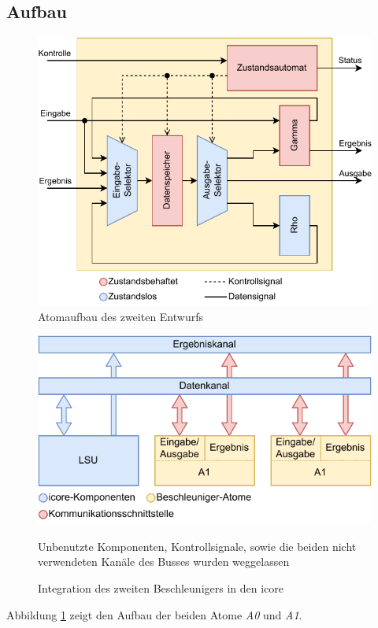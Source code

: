 \subsection{Aufbau}
\begin{figure}
	\center
	\includegraphics{images/Iteration_2.pdf}
	\caption{Atomaufbau des zweiten Entwurfs}
	\label{fig:aufbau_iteration_2}
\end{figure}
\begin{figure}
    \center
    \includegraphics{images/Iteration_2_Integration.pdf}
    \caption{Integration des zweiten Beschleunigers in den icore}
    Unbenutzte Komponenten, Kontrollsignale, sowie die beiden nicht verwendeten Kanäle des Busses wurden weggelassen
    \label{fig:iteration_2_integration}
\end{figure}
Abbildung \ref{fig:aufbau_iteration_2} zeigt den Aufbau der beiden Atome \textit{A0} und \textit{A1}.
